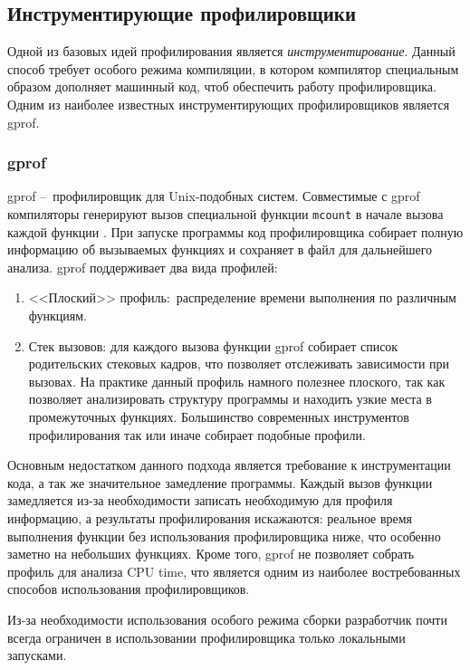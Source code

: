 \subsection{Инструментирующие профилировщики}
Одной из базовых идей профилирования является \textit{инструментирование}.
Данный способ требует особого режима компиляции, в котором компилятор специальным образом дополняет машинный код, чтоб обеспечить работу профилировщика.
Одним из наиболее известных инструментирующих профилировщиков является gprof.

\subsubsection{gprof}
gprof \cite{gprof} – профилировщик для Unix-подобных систем. Совместимые с gprof компиляторы генерируют вызов специальной функции \lstinline!mcount! в начале вызова каждой функции \cite{gprof:mcount}. При запуске программы код профилировщика собирает полную информацию об вызываемых функциях и сохраняет в файл для дальнейшего анализа.
gprof поддерживает два вида профилей:
\begin{enumerate}
    \item <<Плоский>> профиль: распределение времени выполнения по различным функциям.
    \item Стек вызовов: для каждого вызова функции gprof собирает список родительских стековых кадров, что позволяет отслеживать зависимости при вызовах. На практике данный профиль намного полезнее плоского, так как позволяет анализировать структуру программы и находить узкие места в промежуточных функциях. Большинство современных инструментов профилирования так или иначе собирает подобные профили.
\end{enumerate}

Основным недостатком данного подхода является требование к инструментации кода, а так же значительное замедление программы. Каждый вызов функции замедляется из-за необходимости записать необходимую для профиля информацию, а результаты профилирования искажаются: реальное время выполнения функции без использования профилировщика ниже, что особенно заметно на небольших функциях. Кроме того, gprof не позволяет собрать профиль для анализа CPU time, что является одним из наиболее востребованных способов использования профилировщиков.

Из-за необходимости использования особого режима сборки разработчик почти всегда ограничен в использовании профилировщика только локальными запусками.

